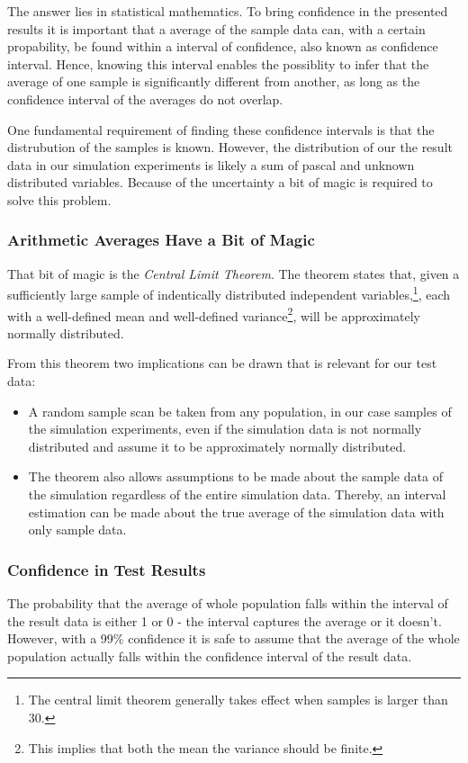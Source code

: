 The answer lies in statistical mathematics. To bring confidence in the presented results it is important that a average of the sample data can, with a certain propability, be found within a interval of confidence, also known as confidence interval. Hence, knowing this interval enables the possiblity to infer that the average of one sample is significantly different from another, as long as the confidence interval of the averages do not overlap.

One fundamental requirement of finding these confidence intervals is that the distrubution of the samples is known. However, the distribution of our the result data in our simulation experiments is likely a sum of pascal and unknown distributed variables. Because of the uncertainty a bit of magic is required to solve this problem. 

\subsubsection{Arithmetic Averages Have a Bit of Magic}
That bit of magic is the \emph{Central Limit Theorem}. The theorem states that, given a sufficiently large sample of indentically distributed independent variables,\footnote{The central limit theorem generally takes effect when samples is larger than 30.}, each with a well-defined mean and well-defined variance\footnote{This implies that both the mean the variance should be finite.}, will be approximately normally distributed\cite{gunnar}.

From this theorem two implications can be drawn that is relevant for our test data:
\begin{itemize}
\item A random sample scan be taken from any population, in our case samples of the simulation experiments, even if the simulation data is not normally distributed and assume it to be approximately normally distributed.

\item The theorem also allows assumptions to be made about the sample data of the simulation regardless of the entire simulation data. Thereby, an interval estimation can be made about the true average of the simulation data with only sample data.
\end{itemize}

 \subsubsection{Confidence in Test Results}
The probability that the average of whole population falls within the interval of the result data is either 1 or 0 - the interval captures the average or it doesn't\cite{gunnar}. However, with a 99\% confidence it is safe to assume that the average of the whole population actually falls within the confidence interval of the result data. 


